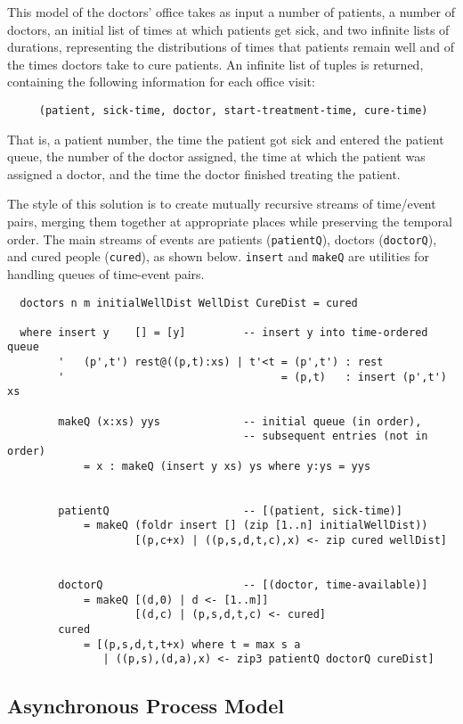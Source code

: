 This model of the doctors' office takes as input a number of patients,
a number of doctors, an initial list of times at which patients get
sick, and two infinite lists of durations, representing the
distributions of times that patients remain well and of the times
doctors take to cure patients.  An infinite list of tuples is
returned, containing the following information for each office visit:
\begin{verbatim}
     (patient, sick-time, doctor, start-treatment-time, cure-time)
\end{verbatim}
That is, a patient number, the time the patient got sick and entered
the patient queue, the number of the doctor assigned, the time at
which the patient was assigned a doctor, and the time the doctor
finished treating the patient.

The style of this solution is to create mutually recursive streams of
time/event pairs, merging them together at appropriate places while
preserving the temporal order.  The main streams of events are
patients ({\tt patientQ}), doctors ({\tt doctorQ}), and cured people
({\tt cured}), as shown below.  {\tt insert} and {\tt makeQ} are
utilities for handling queues of time-event pairs.

\begin{verbatim}
  doctors n m initialWellDist WellDist CureDist = cured

  where insert y    [] = [y]         -- insert y into time-ordered queue
        '   (p',t') rest@((p,t):xs) | t'<t = (p',t') : rest
        '                                  = (p,t)   : insert (p',t') xs

        makeQ (x:xs) yys             -- initial queue (in order),
                                     -- subsequent entries (not in order)
            = x : makeQ (insert y xs) ys where y:ys = yys
    

        patientQ                     -- [(patient, sick-time)]
            = makeQ (foldr insert [] (zip [1..n] initialWellDist))
                    [(p,c+x) | ((p,s,d,t,c),x) <- zip cured wellDist]
    

        doctorQ                      -- [(doctor, time-available)]
            = makeQ [(d,0) | d <- [1..m]]
                    [(d,c) | (p,s,d,t,c) <- cured]
        cured
            = [(p,s,d,t,t+x) where t = max s a
               | ((p,s),(d,a),x) <- zip3 patientQ doctorQ cureDist]
\end{verbatim}

\subsection{Asynchronous Process Model}

